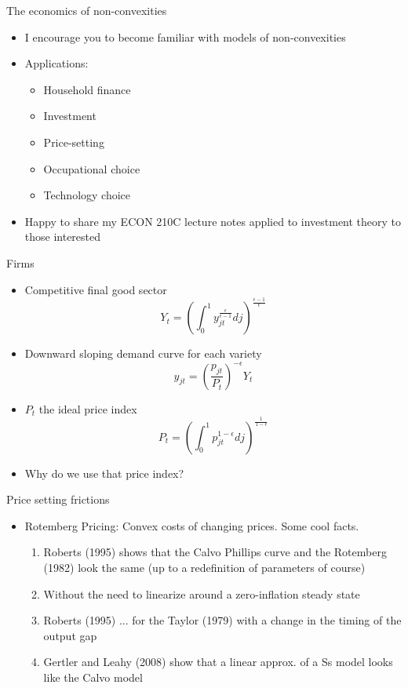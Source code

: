 \documentclass[english,xcolor=svgnames]{beamer}
\begin{document}
\begin{frame}{The economics of non-convexities}
\begin{itemize}
\item I encourage you to become familiar with models of non-convexities
\item Applications:
\begin{itemize}
\item Household finance
\item Investment
\item Price-setting
\item Occupational choice
\item Technology choice
\end{itemize}
\item Happy to share my ECON 210C lecture notes applied to investment theory to those interested
\end{itemize}
\end{frame}


\begin{frame}{Firms}
\begin{itemize}
\item Competitive final good sector
\[Y_t = \left(\int_0^1 y_{jt}^{\frac{\epsilon}{\epsilon-1}}dj\right)^{\frac{\epsilon-1}{\epsilon}}\]
\item Downward sloping demand curve for each variety
\[y_{jt} = \left(\frac{p_{jt}}{P_t}\right)^{-\epsilon} Y_t\]
\item $P_t$ the ideal price index
\[P_t = \left(\int_0^1 p_{jt}^{1-\epsilon}dj\right)^{\frac{1}{1-\epsilon}}\]
\item Why do we use that price index?
\end{itemize}
\end{frame}

\begin{frame}{Price setting frictions}
\begin{itemize}
\item Rotemberg Pricing: Convex costs of changing prices. Some cool facts.
\begin{enumerate}
\item Roberts (1995) shows that the Calvo Phillips curve and the Rotemberg (1982) look the same (up to a redefinition of parameters of course)
\item Without the need to linearize around a zero-inflation steady state
\item Roberts (1995) ... for the Taylor (1979) with a change in the timing of the output gap
\item Gertler and Leahy (2008) show that a linear approx. of a Ss model looks like the Calvo model
\end{enumerate}
\end{itemize}
\end{frame}
\end{document}
